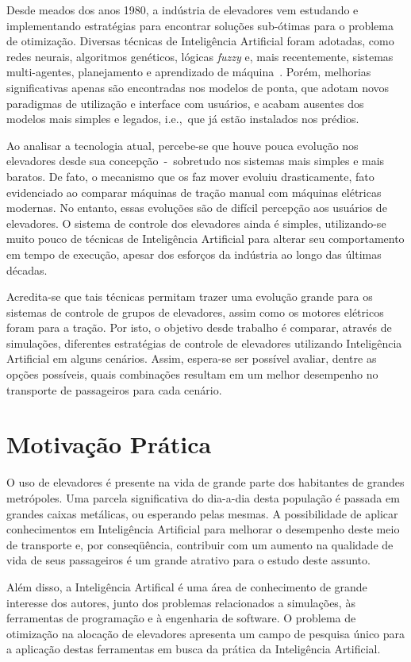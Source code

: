 Desde meados dos anos 1980, a indústria de elevadores vem estudando e
implementando estratégias para encontrar soluções sub-ótimas para o problema de
otimização. Diversas técnicas de Inteligência Artificial foram adotadas, como
redes neurais, algoritmos genéticos, lógicas \textit{fuzzy} e, mais
recentemente, sistemas multi-agentes, planejamento e aprendizado de
máquina~\cite{KOEHLEROTTIGER02}. Porém, melhorias significativas apenas são
encontradas nos modelos de ponta, que adotam novos paradigmas de utilização e
interface com usuários, e acabam ausentes dos modelos mais simples e
legados, i.e.,~que já estão instalados nos prédios.

Ao analisar a tecnologia atual, percebe-se que houve pouca evolução nos
elevadores desde sua concepção~-~sobretudo nos sistemas mais simples e mais
baratos. De fato, o mecanismo que os faz mover evoluiu drasticamente, fato
evidenciado ao comparar máquinas de tração manual com máquinas elétricas
modernas. No entanto, essas evoluções são de difícil percepção aos usuários de
elevadores. O sistema de controle dos elevadores ainda é simples, utilizando-se
muito pouco de técnicas de Inteligência Artificial para alterar seu
comportamento em tempo de execução, apesar dos esforços da indústria ao longo
das últimas décadas.

Acredita-se que tais técnicas permitam trazer uma evolução grande para os
sistemas de controle de grupos de elevadores, assim como os motores elétricos
foram para a tração. Por isto, o objetivo desde trabalho é comparar, através de
simulações, diferentes estratégias de controle de elevadores utilizando
Inteligência Artificial em alguns cenários. Assim, espera-se ser possível
avaliar, dentre as opções possíveis, quais combinações resultam em um melhor
desempenho no transporte de passageiros para cada cenário.

\section{\label{section:motivation}Motivação Prática}

O uso de elevadores é presente na vida de grande parte dos habitantes de grandes
metrópoles. Uma parcela significativa do dia-a-dia desta população é passada em
grandes caixas metálicas, ou esperando pelas mesmas. A possibilidade de aplicar
conhecimentos em Inteligência Artificial para melhorar o desempenho deste meio
de transporte e, por conseqüência, contribuir com um aumento na qualidade de
vida de seus passageiros é um grande atrativo para o estudo deste assunto.

Além disso, a Inteligência Artifical é uma área de conhecimento de grande
interesse dos autores, junto dos problemas relacionados a simulações, às
ferramentas de programação e à engenharia de software. O problema de otimização
na alocação de elevadores apresenta um campo de pesquisa único para a aplicação
destas ferramentas em busca da prática da Inteligência Artificial.
